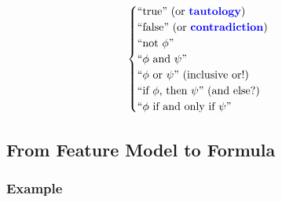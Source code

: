 \begin{frame}{\myframetitle}
\begin{mycolumns}
{\begin{equation*}
\begin{cases}
					\text{``true'' (or \emph{tautology})} \\
					\text{``false'' (or \emph{contradiction})} \\
					\text{``not $\phi$''} \\
					\text{``$\phi$ and $\psi$''} \\
					\text{``$\phi$ or $\psi$'' (inclusive or!)} \\
					\text{``if $\phi$, then $\psi$'' (and else?)} \\
					\text{``$\phi$ if and only if $\psi$''}
				\end{cases}
			\end{equation*}
		}
	\end{mycolumns}
\end{frame}

\subsection{From Feature Model to Formula}

\subsubsection*{Example}

